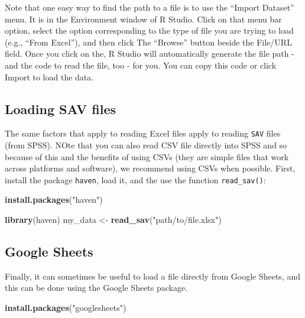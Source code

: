 \documentclass[]{book}
\newenvironment{Shaded}{\begin{snugshade}}{\end{snugshade}}
\newcommand{\KeywordTok}[1]{\textcolor[rgb]{0.13,0.29,0.53}{\textbf{#1}}}
\newcommand{\StringTok}[1]{\textcolor[rgb]{0.31,0.60,0.02}{#1}}
\newcommand{\NormalTok}[1]{#1}
\begin{document}
Note that one easy way to find the path to a file is to use the ``Import
Dataset'' menu. It is in the Environment window of R Studio. Click on
that menu bar option, select the option corresponding to the type of
file you are trying to load (e.g., ``From Excel''), and then click The
``Browse'' button beside the File/URL field. Once you click on the, R
Studio will automatically generate the file path - and the code to read
the file, too - for you. You can copy this code or click Import to load
the data.

\subsection{Loading SAV files}\label{loading-sav-files}

The same factors that apply to reading Excel files apply to reading
\texttt{SAV} files (from SPSS). NOte that you can also read CSV file
directly into SPSS and so because of this and the benefits of using CSVs
(they are simple files that work across platforms and software), we
recommend using CSVs when possible. First, install the package
\texttt{haven}, load it, and the use the function \texttt{read\_sav()}:

\begin{Shaded}
\begin{Highlighting}[]
\KeywordTok{install.packages}\NormalTok{(}\StringTok{"haven"}\NormalTok{)}
\end{Highlighting}
\end{Shaded}

\begin{Shaded}
\begin{Highlighting}[]
\KeywordTok{library}\NormalTok{(haven)}
\NormalTok{my_data <-}
\StringTok{    }\KeywordTok{read_sav}\NormalTok{(}\StringTok{"path/to/file.xlsx"}\NormalTok{)}
\end{Highlighting}
\end{Shaded}

\subsection{Google Sheets}\label{google-sheets}

Finally, it can sometimes be useful to load a file directly from Google
Sheets, and this can be done using the Google Sheets package.

\begin{Shaded}
\begin{Highlighting}[]
\KeywordTok{install.packages}\NormalTok{(}\StringTok{"googlesheets"}\NormalTok{)}
\end{Highlighting}
\end{Shaded}
\end{document}
